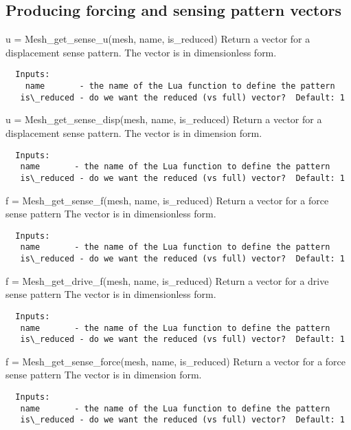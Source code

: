 \subsection{Producing forcing and sensing pattern vectors}
\begin{codelist}

  \item[u = Mesh\_get\_sense\_u(mesh, name, is\_reduced)]
  Return a vector for a displacement sense pattern.
  The vector is in dimensionless form.
\begin{verbatim}
  Inputs:
    name       - the name of the Lua function to define the pattern
   is\_reduced - do we want the reduced (vs full) vector?  Default: 1
\end{verbatim}

  \item[u = Mesh\_get\_sense\_disp(mesh, name, is\_reduced)]
  Return a vector for a displacement sense pattern.
  The vector is in dimension form.
\begin{verbatim}
  Inputs:
   name       - the name of the Lua function to define the pattern
   is\_reduced - do we want the reduced (vs full) vector?  Default: 1
\end{verbatim}

  \item[f = Mesh\_get\_sense\_f(mesh, name, is\_reduced)]
  Return a vector for a force sense pattern
  The vector is in dimensionless form.
\begin{verbatim}
  Inputs:
   name       - the name of the Lua function to define the pattern
   is\_reduced - do we want the reduced (vs full) vector?  Default: 1
\end{verbatim}

  \item[f = Mesh\_get\_drive\_f(mesh, name, is\_reduced)]
  Return a vector for a drive sense pattern
  The vector is in dimensionless form.
\begin{verbatim}
  Inputs:
   name       - the name of the Lua function to define the pattern
   is\_reduced - do we want the reduced (vs full) vector?  Default: 1
\end{verbatim}

  \item[f = Mesh\_get\_sense\_force(mesh, name, is\_reduced)]
  Return a vector for a force sense pattern
  The vector is in dimension form.
\begin{verbatim}
  Inputs:
   name       - the name of the Lua function to define the pattern
   is\_reduced - do we want the reduced (vs full) vector?  Default: 1
\end{verbatim}


\end{codelist}
